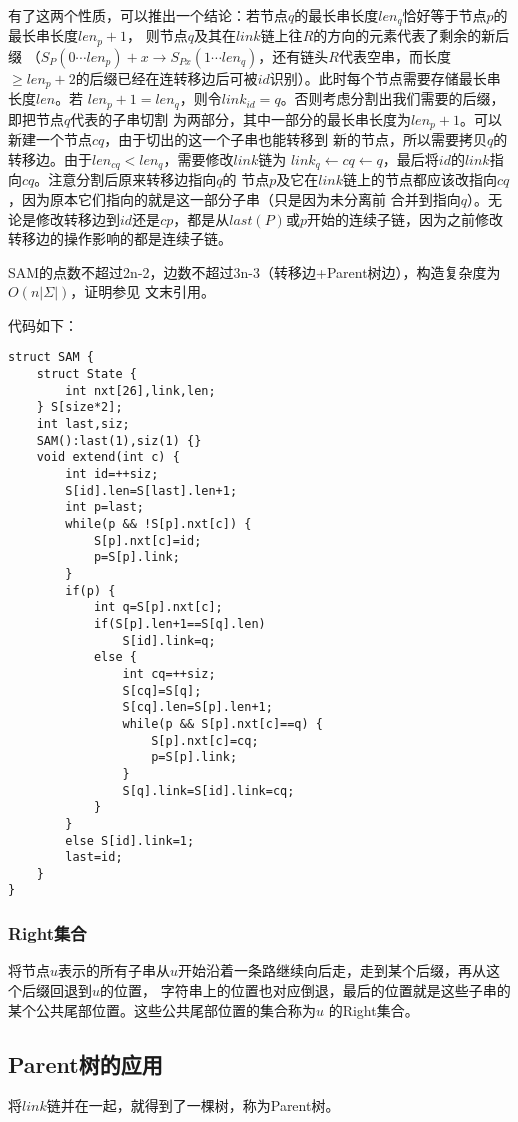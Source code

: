 有了这两个性质，可以推出一个结论：若节点$q$的最长串长度$len_q$恰好等于节点$p$的最长串长度$len_p+1$，
则节点$q$及其在$link$链上往$R$的方向的元素代表了剩余的新后缀
（$S_P(0\cdots len_p)+x\rightarrow S_{Px}(1 \cdots len_q)$，还有链头$R$代表空串，而长度
$\geq len_p+2$的后缀已经在连转移边后可被$id$识别）。此时每个节点需要存储最长串长度$len$。若
$len_p+1=len_q$，则令$link_{id}=q$。否则考虑分割出我们需要的后缀，即把节点$q$代表的子串切割
为两部分，其中一部分的最长串长度为$len_p+1$。可以新建一个节点$cq$，由于切出的这一个子串也能转移到
新的节点，所以需要拷贝$q$的转移边。由于$len_{cq}<len_q$，需要修改$link$链为
$link_q\leftarrow cq \leftarrow q$，最后将$id$的$link$指向$cq$。注意分割后原来转移边指向$q$的
节点$p$及它在$link$链上的节点都应该改指向$cq$，因为原本它们指向的就是这一部分子串（只是因为未分离前
合并到指向$q$）。无论是修改转移边到$id$还是$cp$，都是从$last(P)$或$p$开始的连续子链，因为之前修改
转移边的操作影响的都是连续子链。

SAM的点数不超过2n-2，边数不超过3n-3（转移边+Parent树边），构造复杂度为$O(n|\Sigma|)$，证明参见
文末引用。

代码如下：
\begin{lstlisting}
struct SAM {
    struct State {
        int nxt[26],link,len;
    } S[size*2];
    int last,siz;
    SAM():last(1),siz(1) {}
    void extend(int c) {
        int id=++siz;
        S[id].len=S[last].len+1;
        int p=last;
        while(p && !S[p].nxt[c]) {
            S[p].nxt[c]=id;
            p=S[p].link;
        }
        if(p) {
            int q=S[p].nxt[c];
            if(S[p].len+1==S[q].len)
                S[id].link=q;
            else {
                int cq=++siz;
                S[cq]=S[q];
                S[cq].len=S[p].len+1;
                while(p && S[p].nxt[c]==q) {
                    S[p].nxt[c]=cq;
                    p=S[p].link;
                }
                S[q].link=S[id].link=cq;
            }
        }
        else S[id].link=1;
        last=id;
    }
}
\end{lstlisting}

\subsubsection{Right集合}
将节点$u$表示的所有子串从$u$开始沿着一条路继续向后走，走到某个后缀，再从这个后缀回退到$u$的位置，
字符串上的位置也对应倒退，最后的位置就是这些子串的某个公共尾部位置。这些公共尾部位置的集合称为$u$
的Right集合。
\subsection{Parent树的应用}
将$link$链并在一起，就得到了一棵树，称为Parent树。
